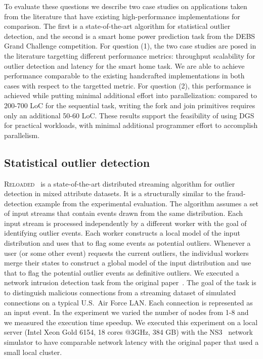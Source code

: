 To evaluate these questions we describe two case studies on applications taken from the literature that have existing high-performance implementations for comparison. The first is a state-of-the-art algorithm for statistical outlier detection, and the second is a smart home power prediction task from the DEBS Grand Challenge competition.
For question (1),
the two case studies are posed in the literature targetting different performance metrics: throughput scalability for outlier detection and latency for the smart home task.
We are able to achieve performance comparable to the existing handcrafted implementations in both cases with respect to the targetted metric.
For question (2), this performance is achieved while putting minimal additional effort into parallelization: compared to 200-700 LoC for the sequential task, writing the fork and join primitives requires only an additional 50-60 LoC.
These results support the feasibility of using DGS for practical workloads, with minimal additional programmer effort to accomplish parallelism.

\subsection{Statistical outlier detection}
\label{ssec:outlier-detection}

\textsc{Reloaded}~\cite{otey2006fast} is a state-of-the-art distributed
streaming algorithm for outlier detection in mixed attribute
datasets. It is a structurally similar
to the fraud-detection example from the experimental evaluation.
The algorithm assumes a set of input streams that
contain events drawn from the same distribution. Each input stream is
processed independently by a different worker with the goal of
identifying outlier events. Each worker constructs a local model of
the input distribution and uses that to flag some events as potential
outliers. Whenever a user (or some other event) requests the current
outliers, the individual workers merge their states to construct a
global model of the input distribution and use that to flag the
potential outlier events as definitive outliers.
We executed a network
intrusion detection task from the original
paper~\cite{kddcup1999dataset}.
The goal of the task is to distinguish malicious connections from a
streaming dataset of simulated connections on a typical U.S.~Air Force
LAN. Each connection is represented as an input event. In the
experiment we varied the number of nodes from 1-8 and we measured the
execution time speedup. We executed this experiment on a local server
(Intel Xeon Gold 6154, 18 cores @3GHz, 384 GB) with the NS3~\cite{carneiro2010ns3} network simulator
to have comparable network latency with the original paper that used a small local cluster.


